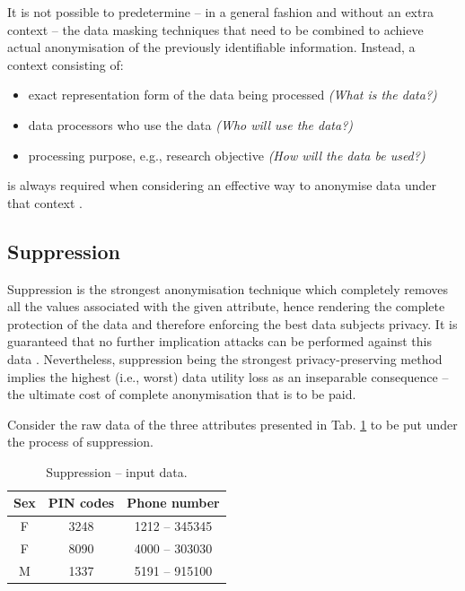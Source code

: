 \documentclass[a4paper,twoside,12pt]{book}
\begin{document}
It is not possible to predetermine – in a general fashion and without an extra context – the data masking techniques that need to be combined to achieve actual anonymisation of the previously identifiable information. Instead, a context consisting of:
\begin{itemize}
	\item exact representation form of the data being processed \textit{(What is the data?)}
	\item data processors who use the data \textit{(Who will use the data?)}
	\item processing purpose, e.g., research objective \textit{(How will the data be used?)}
\end{itemize}
is always required when considering an effective way to anonymise data under that context \cite{bib:anonymizing_health_data}.

\subsection{Suppression}

Suppression is the strongest anonymisation technique which completely removes all the values associated with the given attribute, hence rendering the complete protection of the data and therefore enforcing the best data subjects privacy. It is guaranteed that no further implication attacks can be performed against this data \cite{bib:anonymization_extensive_study}. Nevertheless, suppression being the strongest privacy-preserving method implies the highest (i.e., worst) data utility loss as an inseparable consequence – the ultimate cost of complete anonymisation that is to be paid.

Consider the raw data of the three attributes presented in Tab. \ref{id:tab:suppression_raw} to be put under the process of suppression.

\begin{table}%
\centering
\caption{Suppression – input data.}
\label{id:tab:suppression_raw}
\begin{tabular}{ccc}
\toprule
Sex & \multicolumn{1}{l}{PIN codes} & Phone number \\ \midrule
F   & 3248                          & 1212 – 345345  \\
F   & 8090                          & 4000 – 303030  \\
M   & 1337                          & 5191 – 915100 \\
\bottomrule
\end{tabular}
\end{table}
\end{document}
